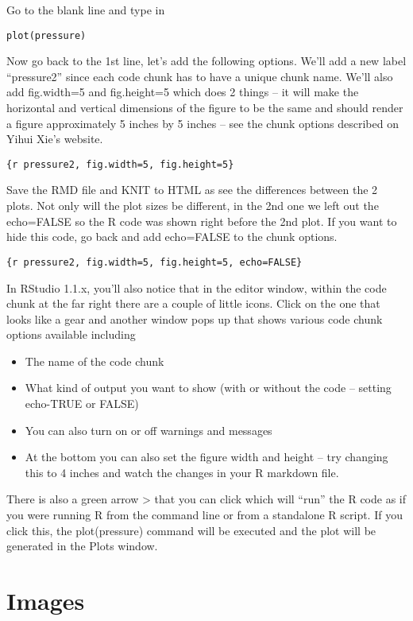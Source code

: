 \documentclass[]{book}
\providecommand{\tightlist}{%
  \setlength{\itemsep}{0pt}\setlength{\parskip}{0pt}}
\theoremstyle{definition}
\theoremstyle{definition}
\theoremstyle{definition}
\theoremstyle{remark}
\begin{document}
Go to the blank line and type in

\texttt{plot(pressure)}

Now go back to the 1st line, let's add the following options. We'll add
a new label ``pressure2'' since each code chunk has to have a unique
chunk name. We'll also add fig.width=5 and fig.height=5 which does 2
things -- it will make the horizontal and vertical dimensions of the
figure to be the same and should render a figure approximately 5 inches
by 5 inches -- see the chunk options described on Yihui Xie's website.

\texttt{\{r\ pressure2,\ fig.width=5,\ fig.height=5\}}

Save the RMD file and KNIT to HTML as see the differences between the 2
plots. Not only will the plot sizes be different, in the 2nd one we left
out the echo=FALSE so the R code was shown right before the 2nd plot. If
you want to hide this code, go back and add echo=FALSE to the chunk
options.

\texttt{\{r\ pressure2,\ fig.width=5,\ fig.height=5,\ echo=FALSE\}}

In RStudio 1.1.x, you'll also notice that in the editor window, within
the code chunk at the far right there are a couple of little icons.
Click on the one that looks like a gear and another window pops up that
shows various code chunk options available including

\begin{itemize}
\tightlist
\item
  The name of the code chunk
\item
  What kind of output you want to show (with or without the code --
  setting echo-TRUE or FALSE)
\item
  You can also turn on or off warnings and messages
\item
  At the bottom you can also set the figure width and height -- try
  changing this to 4 inches and watch the changes in your R markdown
  file.
\end{itemize}

There is also a green arrow \textgreater{} that you can click which will
``run'' the R code as if you were running R from the command line or
from a standalone R script. If you click this, the plot(pressure)
command will be executed and the plot will be generated in the Plots
window.

\section{Images}\label{images}
\end{document}
